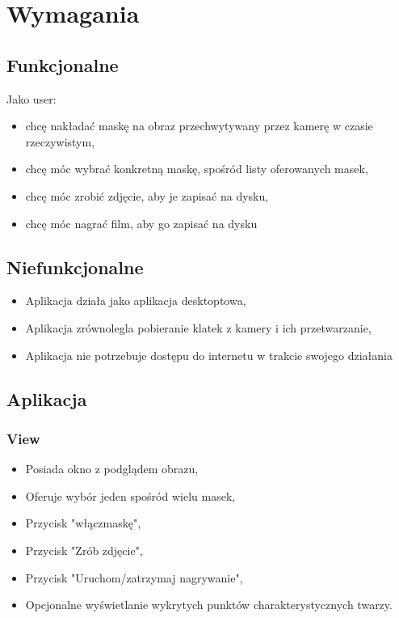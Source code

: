 \section{Wymagania}
\subsection{Funkcjonalne}
Jako user:
\begin{itemize}
    \item chcę nakładać maskę na obraz przechwytywany przez kamerę w czasie rzeczywistym,
    \item chcę móc wybrać konkretną maskę, spośród listy oferowanych masek,
    \item chcę móc zrobić zdjęcie, aby je zapisać na dysku,
    \item chcę móc nagrać film, aby go zapisać na dysku
\end{itemize}
\subsection{Niefunkcjonalne}
\begin{itemize}
    \item Aplikacja działa jako aplikacja desktoptowa,
    \item Aplikacja zrównolegla pobieranie klatek z kamery i ich przetwarzanie,
    \item Aplikacja nie potrzebuje dostępu do internetu w trakcie swojego działania
\end{itemize}

\subsection{Aplikacja}
\subsubsection{View}
\begin{itemize}
    \item Posiada okno z podglądem obrazu,
    \item Oferuje wybór jeden spośród wielu masek,
    \item Przycisk "włącz maskę",
    \item Przycisk "Zrób zdjęcie",
    \item Przycisk "Uruchom/zatrzymaj nagrywanie",
    \item Opcjonalne wyświetlanie wykrytych punktów charakterystycznych twarzy.
\end{itemize}
